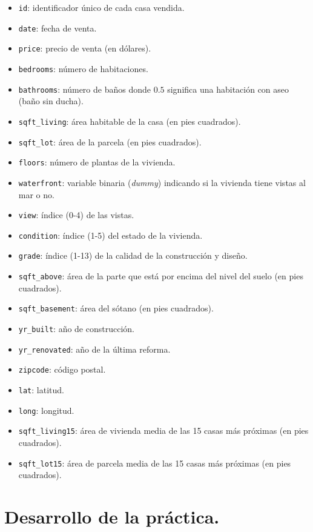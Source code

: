 \documentclass[]{article}
\providecommand{\tightlist}{%
  \setlength{\itemsep}{0pt}\setlength{\parskip}{0pt}}
\begin{document}
\begin{itemize}
\tightlist
\item
  \texttt{id}: identificador único de cada casa vendida.
\item
  \texttt{date}: fecha de venta.
\item
  \texttt{price}: precio de venta (en dólares).
\item
  \texttt{bedrooms}: número de habitaciones.
\item
  \texttt{bathrooms}: número de baños donde \(0.5\) significa una
  habitación con aseo (baño sin ducha).
\item
  \texttt{sqft\_living}: área habitable de la casa (en pies cuadrados).
\item
  \texttt{sqft\_lot}: área de la parcela (en pies cuadrados).
\item
  \texttt{floors}: número de plantas de la vivienda.
\item
  \texttt{waterfront}: variable binaria (\emph{dummy}) indicando si la
  vivienda tiene vistas al mar o no.
\item
  \texttt{view}: índice (0-4) de las vistas.
\item
  \texttt{condition}: índice (1-5) del estado de la vivienda.
\item
  \texttt{grade}: índice (1-13) de la calidad de la construcción y
  diseño.
\item
  \texttt{sqft\_above}: área de la parte que está por encima del nivel
  del suelo (en pies cuadrados).
\item
  \texttt{sqft\_basement}: área del sótano (en pies cuadrados).
\item
  \texttt{yr\_built}: año de construcción.
\item
  \texttt{yr\_renovated}: año de la última reforma.
\item
  \texttt{zipcode}: código postal.
\item
  \texttt{lat}: latitud.
\item
  \texttt{long}: longitud.
\item
  \texttt{sqft\_living15}: área de vivienda media de las 15 casas más
  próximas (en pies cuadrados).
\item
  \texttt{sqft\_lot15}: área de parcela media de las 15 casas más
  próximas (en pies cuadrados).
\end{itemize}

\hypertarget{desarrollo-de-la-practica.}{%
\section{Desarrollo de la práctica.}\label{desarrollo-de-la-practica.}}
\end{document}
